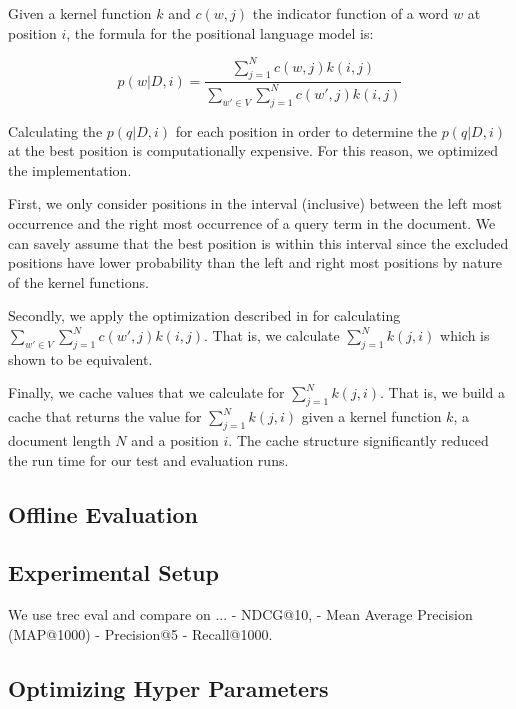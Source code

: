 Given a kernel function $k$ and $c(w,j)$ the indicator
function of a word $w$ at position $i$,
the formula for the positional language model is:

\begin{equation*}
p(w|D,i) = \frac{\sum_{j=1}^N c(w,j)k(i,j)}
{\sum_{w' \in V} \sum_{j=1}^N c(w',j)k(i,j)} 
\end{equation*}

Calculating the $p(q|D,i)$ for each position
in order to determine the $p(q|D,i)$ at the 
best position is computationally expensive.
For this reason, we optimized the implementation.

First, we only consider positions in the interval
(inclusive) between the left most occurrence and the right most
occurrence of a query term in the document.
We can savely assume that the best position is within this interval
since the excluded positions have lower probability
than the left and right most positions
by nature of the kernel functions.

Secondly, we apply the optimization 
described in \cite{PLM} for calculating
$\sum_{w' \in V} \sum_{j=1}^N c(w',j)k(i,j)$.
That is, we calculate $\sum_{j=1}^N k(j,i)$ which
is shown to be equivalent.

Finally, we cache values that we calculate for 
$\sum_{j=1}^N k(j,i)$. That is,
we build a cache that returns the
value for $\sum_{j=1}^N k(j,i)$ given
a kernel function $k$, a document length $N$
and a position $i$. The cache structure
significantly reduced the run time
for our test and evaluation runs.


\subsection{Offline Evaluation}
\label{LexicalModels:Evaluation}

\subsection{Experimental Setup}



We use trec eval and compare on ...
- NDCG@10, 
- Mean Average Precision (MAP@1000) 
- Precision@5
- Recall@1000.

\subsection{Optimizing Hyper Parameters}

